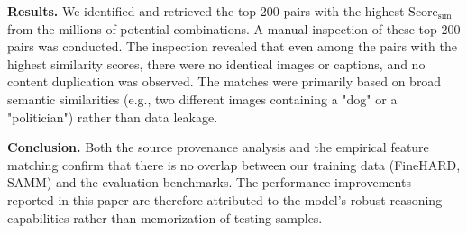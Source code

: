 \documentclass{article}
\theoremstyle{plain}
\theoremstyle{definition}
\theoremstyle{remark}
\begin{document}
\textbf{Results.} We identified and retrieved the top-200 pairs with the highest $\text{Score}_\text{sim}$ from the millions of potential combinations. A manual inspection of these top-200 pairs was conducted. The inspection revealed that even among the pairs with the highest similarity scores, there were no identical images or captions, and no content duplication was observed. The matches were primarily based on broad semantic similarities (e.g., two different images containing a "dog" or a "politician") rather than data leakage.

\textbf{Conclusion.} Both the source provenance analysis and the empirical feature matching confirm that there is no overlap between our training data (FineHARD, SAMM) and the evaluation benchmarks. The performance improvements reported in this paper are therefore attributed to the model's robust reasoning capabilities rather than memorization of testing samples.
\end{document}
